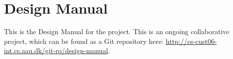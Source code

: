 
\chapter{Design Manual}
\label{app:design_manual}

This is the Design Manual for the \giraf project. This is an ongoing collaborative project, which can be found as a Git repository here: \url{http://cs-cust06-int.cs.aau.dk/git-ro/design-manual}.
% 